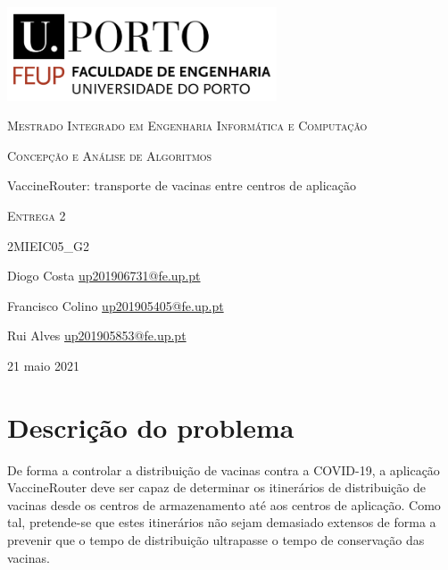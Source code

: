 \documentclass[12pt,a4paper]{report}
\begin{document}
\begin{titlepage}
	\centering
	\includegraphics[width=0.6\textwidth]{../feup.png}\par\vspace{1cm}
	{\scshape Mestrado Integrado em Engenharia Informática e Computação \par}
	\vspace{1cm}
	{\scshape Concepção e Análise de Algoritmos \par}
	\vspace{1.5cm}
	{\huge VaccineRouter: transporte de vacinas entre centros de aplicação \par}
	\vspace{1cm}
	{\scshape Entrega 2}
	\vspace{4cm}
	
	{\scshape 2MIEIC05\_G2 \par}
	\vspace{0.5cm}

	{ Diogo Costa \href{mailto:up201906731@fe.up.pt}{up201906731@fe.up.pt} \par}
	{ Francisco Colino \href{mailto:up201905405@fe.up.pt}{up201905405@fe.up.pt} \par}
	{ Rui Alves \href{mailto:up201905853@fe.up.pt}{up201905853@fe.up.pt} \par}
	\vspace{2cm}
	

	{\large 21 maio 2021\par}
\end{titlepage}


\tableofcontents{}
\newpage

\chapter{Descrição do problema}
De forma a controlar a distribuição de vacinas contra a COVID-19, a aplicação VaccineRouter deve ser capaz de determinar os itinerários de distribuição de vacinas desde os centros de armazenamento até aos centros de aplicação. Como tal, pretende-se que estes itinerários não sejam demasiado extensos de forma a prevenir que o tempo de distribuição ultrapasse o tempo de conservação das vacinas.
\end{document}
